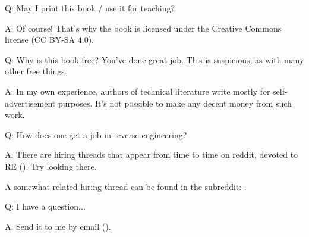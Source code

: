 \par Q: May I print this book / use it for teaching?
\par A: Of course! That's why the book is licensed under the Creative Commons license (CC BY-SA 4.0).

\par Q: Why is this book free? You've done great job. This is suspicious, as with many other free things.
\par A: In my own experience, authors of technical literature write mostly for self-advertisement purposes. It's not possible to make any decent money from such work.

\par Q: How does one get a job in reverse engineering?
\par A: There are hiring threads that appear from time to time on reddit, devoted to RE\FNURLREDDIT{}
(\RedditHiringThread{}).
Try looking there.

A somewhat related hiring thread can be found in the  subreddit: \NetsecHiringThread{}.

\par Q: I have a question...
\par A: Send it to me by email (\EMAIL).
